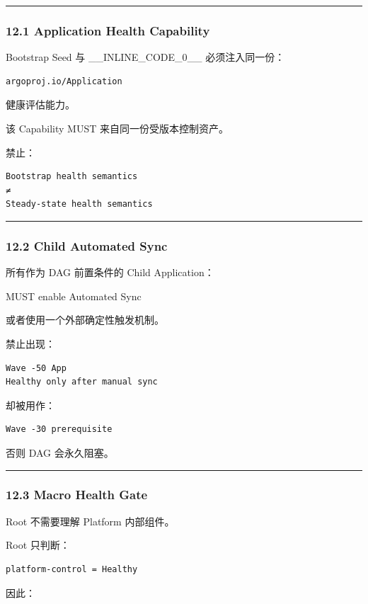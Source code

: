 \documentclass[11pt,a4paper]{article}
\begin{document}
\vspace{0.5em}\hrule\vspace{0.5em}
\subsubsection{12.1 Application Health Capability}
Bootstrap Seed 与 \_\_INLINE\_CODE\_0\_\_ 必须注入同一份：

\begin{lstlisting}[language=text]
argoproj.io/Application
\end{lstlisting}
健康评估能力。

该 Capability MUST 来自同一份受版本控制资产。

禁止：

\begin{lstlisting}[language=text]
Bootstrap health semantics
≠
Steady-state health semantics
\end{lstlisting}
\vspace{0.5em}\hrule\vspace{0.5em}
\subsubsection{12.2 Child Automated Sync}
所有作为 DAG 前置条件的 Child Application：

\begin{gfmBlockquote}
MUST enable Automated Sync
\end{gfmBlockquote}
或者使用一个外部确定性触发机制。

禁止出现：

\begin{lstlisting}[language=text]
Wave -50 App
Healthy only after manual sync
\end{lstlisting}
却被用作：

\begin{lstlisting}[language=text]
Wave -30 prerequisite
\end{lstlisting}
否则 DAG 会永久阻塞。

\vspace{0.5em}\hrule\vspace{0.5em}
\subsubsection{12.3 Macro Health Gate}
Root 不需要理解 Platform 内部组件。

Root 只判断：

\begin{lstlisting}[language=text]
platform-control = Healthy
\end{lstlisting}
因此：
\end{document}
